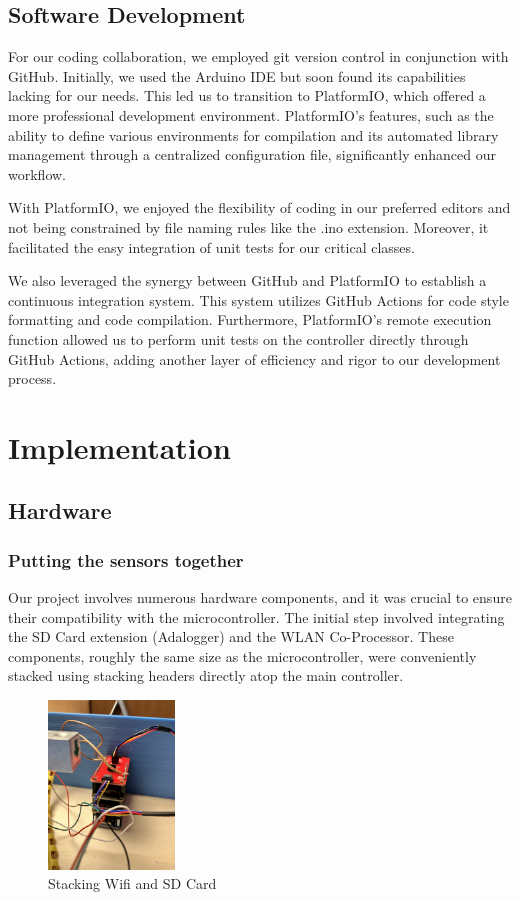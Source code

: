 \documentclass{article}
\begin{document}
\subsection{Software Development}
For our coding collaboration, we employed git version control in conjunction with GitHub. Initially, we used the Arduino IDE but soon found its capabilities lacking for our needs. This led us to transition to PlatformIO, which offered a more professional development environment. PlatformIO's features, such as the ability to define various environments for compilation and its automated library management through a centralized configuration file, significantly enhanced our workflow.

With PlatformIO, we enjoyed the flexibility of coding in our preferred editors and not being constrained by file naming rules like the .ino extension. Moreover, it facilitated the easy integration of unit tests for our critical classes.

We also leveraged the synergy between GitHub and PlatformIO to establish a continuous integration system. This system utilizes GitHub Actions for code style formatting and code compilation. Furthermore, PlatformIO's remote execution function allowed us to perform unit tests on the controller directly through GitHub Actions, adding another layer of efficiency and rigor to our development process.

\section{Implementation}

\subsection{Hardware}

\subsubsection{Putting the sensors together}
Our project involves numerous hardware components, and it was crucial to ensure their compatibility with the microcontroller. The initial step involved integrating the SD Card extension (Adalogger) and the WLAN Co-Processor. These components, roughly the same size as the microcontroller, were conveniently stacked using stacking headers directly atop the main controller.

\begin{figure}[h]
	\centering
	\includegraphics[angle=90,width=0.3\textwidth]{controller.jpeg}
	\caption{Stacking Wifi and SD Card}
	\label{fig:mesh1}
\end{figure}
\end{document}
